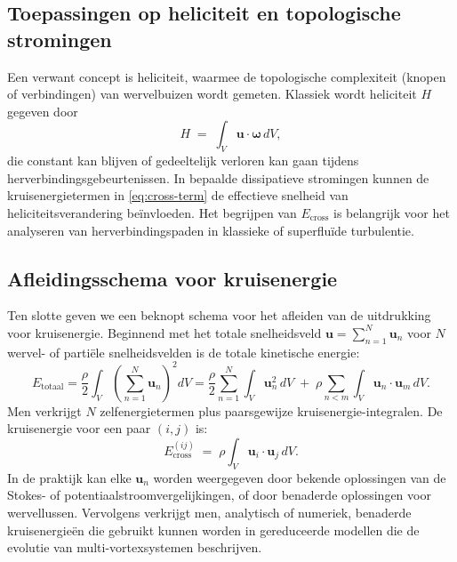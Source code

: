 \subsection{Toepassingen op heliciteit en topologische stromingen}
\label{sec:helicity}
Een verwant concept is heliciteit, waarmee de topologische complexiteit (knopen of
verbindingen) van wervelbuizen wordt gemeten. Klassiek wordt heliciteit $H$ gegeven door
\begin{equation}
H \;=\; \int_V \mathbf{u} \cdot \boldsymbol{\omega}\, dV,\label{eq:appendix:helicity}
\end{equation}
die constant kan blijven of gedeeltelijk verloren kan gaan tijdens herverbindingsgebeurtenissen. In bepaalde
dissipatieve stromingen kunnen de kruisenergietermen in \eqref{eq:cross-term} de effectieve snelheid van heliciteitsverandering beïnvloeden. Het begrijpen van $E_\text{cross}$ is belangrijk
voor het analyseren van herverbindingspaden in klassieke of superfluïde turbulentie.

\subsection{Afleidingsschema voor kruisenergie}
\label{sec:derivation}
Ten slotte geven we een beknopt schema voor het afleiden van de uitdrukking voor kruisenergie. Beginnend met het totale snelheidsveld $\mathbf{u} = \sum_{n=1}^N \mathbf{u}_n$
voor $N$ wervel- of partiële snelheidsvelden is de totale kinetische energie:
\begin{equation}
E_\text{totaal}
= \frac{\rho}{2} \int_V \left(\sum_{n=1}^N \mathbf{u}_n \right)^2 dV
= \frac{\rho}{2} \sum_{n=1}^N \int_V \mathbf{u}_n^2 \, dV
\;+\;\rho \sum_{n<m} \int_V \mathbf{u}_n \cdot \mathbf{u}_m \, dV.\label{eq:appendix:total-energy-derivation}
\end{equation}
Men verkrijgt $N$ zelfenergietermen plus paarsgewijze kruisenergie-integralen.
De kruisenergie voor een paar $(i,j)$ is:
\begin{equation}
E_\text{cross}^{(ij)} \;=\; \rho \int_V \mathbf{u}_i \cdot \mathbf{u}_j \, dV.\label{eq:appendix:cross-energy-derivation}
\end{equation}
In de praktijk kan elke $\mathbf{u}_n$ worden weergegeven door bekende oplossingen van de
Stokes- of potentiaalstroomvergelijkingen, of door benaderde oplossingen voor wervellussen. Vervolgens verkrijgt men, analytisch of numeriek, benaderde kruisenergieën
die gebruikt kunnen worden in gereduceerde modellen die de evolutie van multi-vortexsystemen beschrijven.

